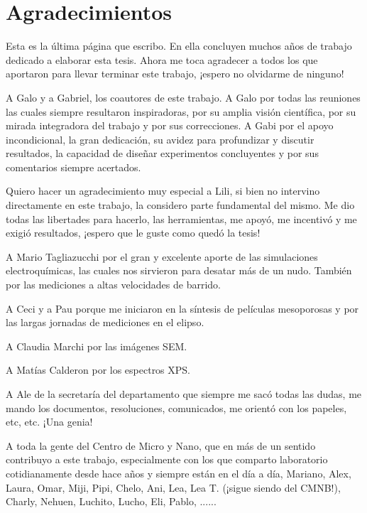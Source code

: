 \vfill
\cleardoublepage

\mtcaddchapter[Agradecimientos]	

\section*{\centering Agradecimientos} 

Esta es la última página que escribo. En ella concluyen muchos años de trabajo dedicado a elaborar esta tesis. Ahora me toca agradecer a todos los que aportaron para llevar terminar este trabajo, ¡espero no olvidarme de ninguno!\bigskip

A Galo y a Gabriel, los coautores de este trabajo. A Galo por todas las reuniones las cuales siempre resultaron inspiradoras, por su amplia visión científica, por su mirada integradora del trabajo y por sus correcciones. A Gabi por el apoyo incondicional, la gran dedicación, su avidez para profundizar y discutir resultados, la capacidad de diseñar experimentos concluyentes y por sus comentarios siempre acertados.\bigskip

Quiero hacer un agradecimiento muy especial a Lili, si bien no intervino directamente en este trabajo, la considero parte fundamental del mismo. Me dio todas las libertades para hacerlo, las herramientas, me apoyó, me incentivó y me exigió resultados, ¡espero que le guste como quedó la tesis!\bigskip

A Mario Tagliazucchi por el gran y excelente aporte de las simulaciones electroquímicas, las cuales nos sirvieron para desatar más de un nudo. También por las mediciones a altas velocidades de barrido. \bigskip

A Ceci y a Pau porque me iniciaron en la síntesis de películas mesoporosas y por las largas jornadas de mediciones en el elipso.\bigskip

A Claudia Marchi por las imágenes SEM.\bigskip

A Matías Calderon por los espectros XPS.\bigskip

A Ale de la secretaría del departamento que siempre me sacó todas las dudas, me mando los documentos, resoluciones, comunicados, me orientó con los papeles, etc, etc. ¡Una genia!\bigskip

A toda la gente del Centro de Micro y Nano, que en más de un sentido contribuyo a este trabajo, especialmente con los que comparto laboratorio cotidianamente desde hace años y siempre están en el día a día, Mariano, Alex, Laura, Omar, Miji, Pipi, Chelo, Ani, Lea, Lea T. (¡sigue siendo del CMNB!), Charly, Nehuen, Luchito, Lucho, Eli, Pablo, ......\bigskip


